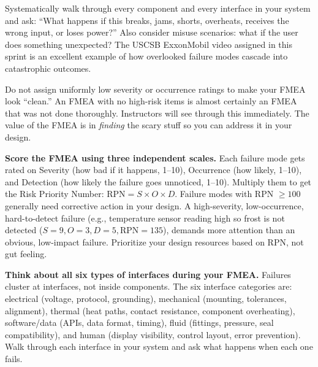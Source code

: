 \begin{faqbox}
Systematically walk through every component and every interface in your system and ask: ``What happens if this breaks, jams, shorts, overheats, receives the wrong input, or loses power?'' Also consider misuse scenarios: what if the user does something unexpected? The USCSB ExxonMobil video assigned in this sprint is an excellent example of how overlooked failure modes cascade into catastrophic outcomes.
\end{faqbox}

\begin{warnbox}
Do not assign uniformly low severity or occurrence ratings to make your FMEA look ``clean.'' An FMEA with no high-risk items is almost certainly an FMEA that was not done thoroughly. Instructors will see through this immediately. The value of the FMEA is in \textit{finding} the scary stuff so you can address it in your design.
\end{warnbox}

\begin{tipbox}
\textbf{Score the FMEA using three independent scales.} Each failure mode gets rated on Severity (how bad if it happens, 1--10), Occurrence (how likely, 1--10), and Detection (how likely the failure goes unnoticed, 1--10). Multiply them to get the Risk Priority Number: $\text{RPN} = S \times O \times D$. Failure modes with RPN $\geq 100$ generally need corrective action in your design. A high-severity, low-occurrence, hard-to-detect failure (e.g., temperature sensor reading high so frost is not detected ($S=9, O=3, D=5, \text{RPN}=135$), demands more attention than an obvious, low-impact failure. Prioritize your design resources based on RPN, not gut feeling.
\end{tipbox}

\begin{protip}
\textbf{Think about all six types of interfaces during your FMEA.} Failures cluster at interfaces, not inside components. The six interface categories are: electrical (voltage, protocol, grounding), mechanical (mounting, tolerances, alignment), thermal (heat paths, contact resistance, component overheating), software/data (APIs, data format, timing), fluid (fittings, pressure, seal compatibility), and human (display visibility, control layout, error prevention). Walk through each interface in your system and ask what happens when each one fails.
\end{protip}

